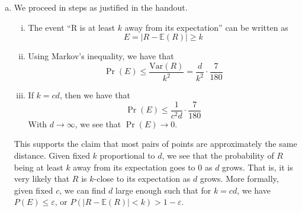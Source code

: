 \documentclass{article}
\renewcommand{\epsilon}{\varepsilon}
\begin{document}
\begin{enumerate}[(a)]
    \item We proceed in steps as justified in the handout. 
    \begin{enumerate}[i. ]
        \item The event ``R is at least $k$ away from its expectation'' can be written as \[E = |R - \mathbb{E}(R)| \geq k\]
        \item Using Markov's inequality, we have that \[\Pr(E) \leq \frac{\text{Var}(R)}{k^2} = \frac{d}{k^2} \cdot \frac{7}{180}\]
        \item If $k = cd$, then we have that \[\Pr(E) \leq \frac{1}{c^2 d} \cdot \frac{7}{180}\]
        With $d \to \infty$, we see that $\Pr(E) \to 0$.
    \end{enumerate}

    This supports the claim that most pairs of points are approximately the same distance. Given fixed $k$ proportional to $d$, we see that the probability of $R$ being at least $k$ away from its expectation goes to 0 as $d$ grows. That is, it is very likely that $R$ is $k$-close to its expectation as $d$ grows. More formally, given fixed $c$, we can find $d$ large enough such that for $k = cd$, we have $P(E) \leq \epsilon$, or $P(|R - \mathbb{E}(R)| < k) >  1 - \epsilon$.
\end{enumerate}
\end{document}
